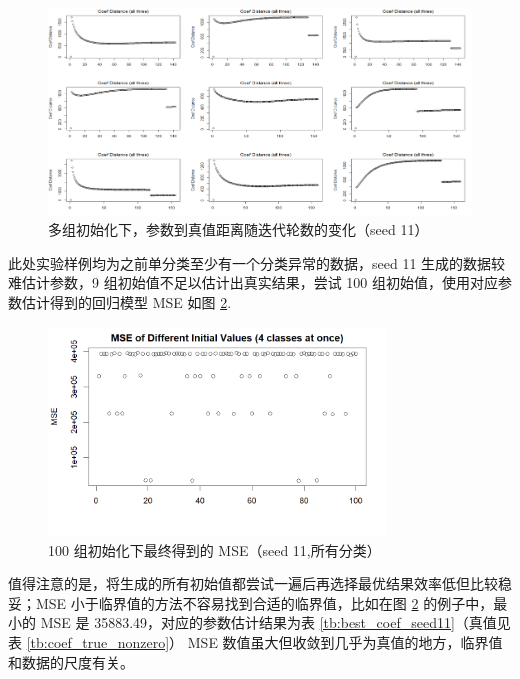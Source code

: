 \documentclass[12pt, a4paper, oneside]{article}
\numberwithin{equation}{section}
\begin{document}
\begin{figure}
	\centering
	\includegraphics[width=\textwidth]{img/seed11.png}
	\caption{多组初始化下，参数到真值距离随迭代轮数的变化（seed 11）}
	\label{fig:seed11}
\end{figure}

此处实验样例均为之前单分类至少有一个分类异常的数据，seed 11 生成的数据较难估计参数，9 组初始值不足以估计出真实结果，尝试 100 组初始值，使用对应参数估计得到的回归模型 MSE 如图 \ref{fig:seed11}.

\begin{figure}
	\centering
	\includegraphics[width=0.8\textwidth]{img/seed11k1234_200.png}
	\caption{100 组初始化下最终得到的 MSE（seed 11,所有分类）}
	\label{fig:seed11}
\end{figure}

值得注意的是，将生成的所有初始值都尝试一遍后再选择最优结果效率低但比较稳妥；MSE 小于临界值的方法不容易找到合适的临界值，比如在图 \ref{fig:seed11} 的例子中，最小的 MSE 是 35883.49，对应的参数估计结果为表 \ref{tb:best_coef_seed11}（真值见表 \ref{tb:coef_true_nonzero}） MSE 数值虽大但收敛到几乎为真值的地方，临界值和数据的尺度有关。
\end{document}
